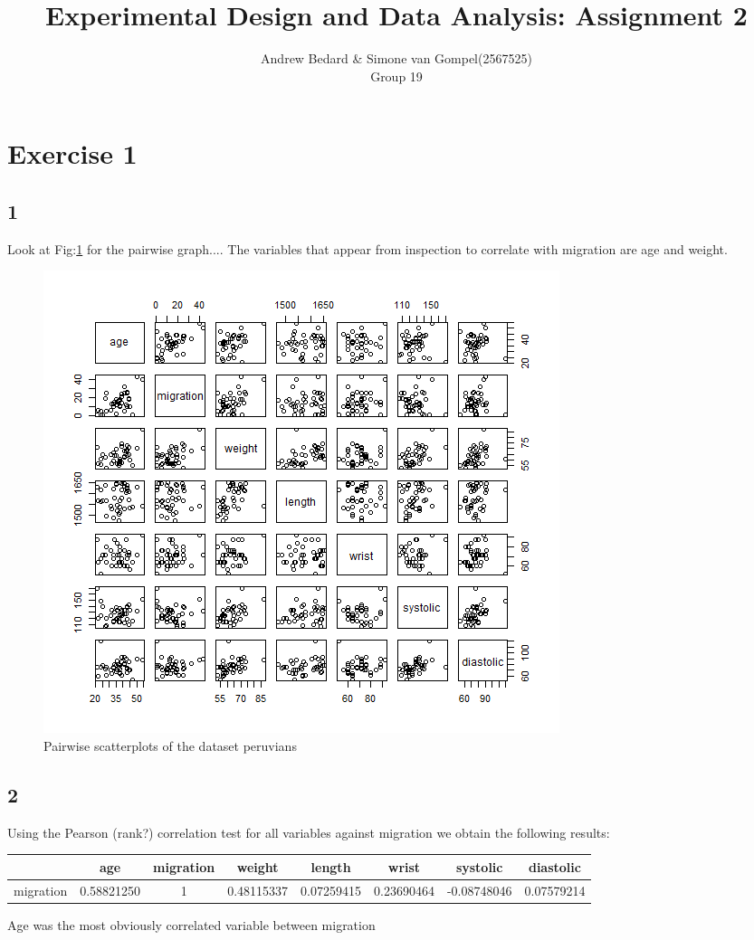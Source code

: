 \documentclass{article}
\title{Experimental Design and Data Analysis: Assignment 2}
\author{Andrew Bedard \& Simone van Gompel(2567525) \\ Group 19}
\begin{document}
  \maketitle

  \section{Exercise 1}
  \subsection*{1}
  	Look at Fig:\ref{fig:Pairs} for the pairwise graph....
  	The variables that appear from inspection to correlate with migration are age and weight.

    \begin{figure}
      \includegraphics[scale=0.6]{../results/Pairs.png}
      \caption{Pairwise scatterplots of the dataset peruvians}
      \label{fig:Pairs}
    \end{figure}
    
    \subsection*{2}
    Using the Pearson (rank?) correlation test for all variables against migration we obtain the following results:
    \newline
    \centering
    \begin{tabular}{|c|c|c|c|c|c|c|c|}
    \hline 
     & age & migration & weight & length & wrist & systolic & diastolic \\ 
    \hline 
    migration & 0.58821250 & 1 & 0.48115337 & 0.07259415 & 0.23690464 & -0.08748046 & 0.07579214 \\ 
    \hline 
    \end{tabular} 
    
    Age was the most obviously correlated variable between migration 
\end{document}
